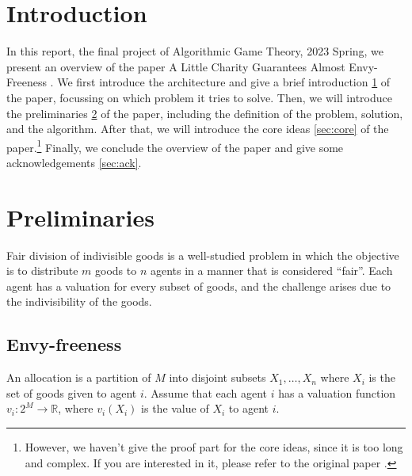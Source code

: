 \documentclass{article}
\begin{document}


\newpage
\tableofcontents



\newpage
\section{Introduction} \label{sec:intro}
In this report, the final project of Algorithmic Game Theory, 2023 Spring, we present an overview of the paper A Little Charity Guarantees Almost Envy-Freeness \cite{chaudhury2020little}. We first introduce the architecture and give a brief introduction \ref{sec:intro} of the paper, focussing on which problem it tries to solve. Then, we will introduce the preliminaries \ref{sec:pre} of the paper, including the definition of the problem, solution, and the algorithm. After that, we will introduce the core ideas \ref{sec:core} of the paper.\footnote{However, we haven't give the proof part for the core ideas, since it is too long and complex. If you are interested in it, please refer to the original paper \cite{chaudhury2020little}.} Finally, we conclude the overview of the paper and give some acknowledgements \ref{sec:ack}.

\section{Preliminaries} \label{sec:pre}
Fair division of indivisible goods is a well-studied problem in which the objective is to distribute $m$ goods to $n$ agents in a manner that is considered “fair”. Each agent has a valuation for every subset of goods, and the challenge arises due to the indivisibility of the goods.

\subsection{Envy-freeness}

An allocation is a partition of $M$ into disjoint subsets $X_1, \ldots, X_n$ where $X_i$ is the set of goods given to agent $i$. 
Assume that each agent $i$ has a valuation function $v_i: 2^M \rightarrow \mathbb{R}$, where $v_i(X_i)$ is the value of $X_i$ to agent $i$.
\end{document}
